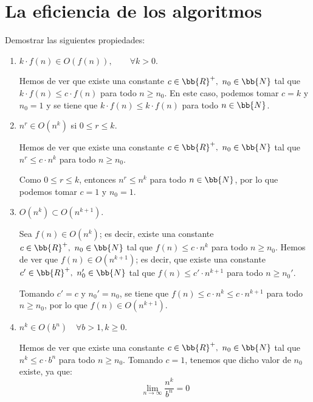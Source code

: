 \section{La eficiencia de los algoritmos}

\begin{ejercicio}\label{ej:1.1}
    Demostrar las siguientes propiedades:
    \begin{enumerate}[label=\alph*)]
        \item $k\cdot f(n) \in O(f(n)), \qquad \forall k > 0$.
        
        Hemos de ver que existe una constante $c\in \bb{R}^+,~n_0\in \bb{N}$ tal que $k\cdot f(n) \leq c\cdot f(n)$ para todo $n\geq n_0$.
        En este caso, podemos tomar $c=k$ y $n_0=1$ y se tiene que $k\cdot f(n) \leq k\cdot f(n)$ para todo $n\in \bb{N}$.
        
        \item $n^r\in O(n^k)$ si $0\leq r \leq k$.
        
        Hemos de ver que existe una constante $c\in \bb{R}^+,~n_0\in \bb{N}$ tal que $n^r \leq c\cdot n^k$ para todo $n\geq n_0$.

        Como $0\leq r \leq k$, entonces $n^r \leq n^k$ para todo $n\in \bb{N}$, por lo que podemos tomar $c=1$ y $n_0=1$.

        \item $O(n^k) \subset O(n^{k+1})$.
        
        Sea $f(n)\in O(n^k)$; es decir, existe una constante $c\in \bb{R}^+,~n_0\in \bb{N}$ tal que $f(n)\leq c\cdot n^k$ para todo $n\geq n_0$.
        Hemos de ver que $f(n)\in O(n^{k+1})$; es decir, que existe una constante $c'\in \bb{R}^+,~n_0'\in \bb{N}$ tal que $f(n)\leq c'\cdot n^{k+1}$ para todo $n\geq n_0'$.

        Tomando $c'=c$ y $n_0'=n_0$, se tiene que $f(n)\leq c\cdot n^k\leq c\cdot n^{k+1}$ para todo $n\geq n_0$, por lo que $f(n)\in O(n^{k+1})$.

        \item $n^k\in O(b^n) \quad \forall b>1,k\geq 0$.
        
        Hemos de ver que existe una constante $c\in \bb{R}^+,~n_0\in \bb{N}$ tal que $n^k \leq c\cdot b^n$ para todo $n\geq n_0$.
        Tomando $c=1$, tenemos que dicho valor de $n_0$ existe, ya que:
        \begin{equation*}
            \lim_{n\to\infty} \frac{n^k}{b^n} = 0
        \end{equation*}



\end{enumerate}
\end{ejercicio}
